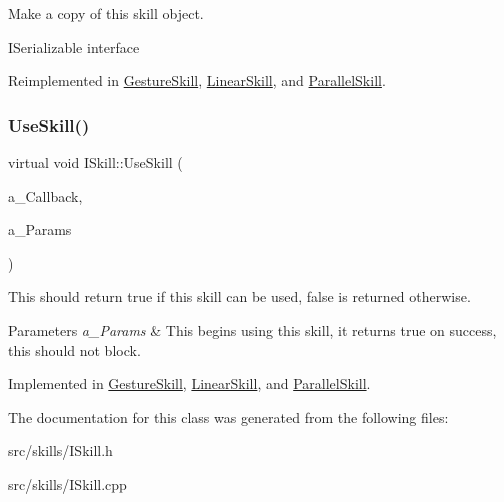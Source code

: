 Make a copy of this skill object. 

I\+Serializable interface 

Reimplemented in \hyperlink{class_gesture_skill_a9a0b5dcba0cbbced2bfc5108304d7513}{Gesture\+Skill}, \hyperlink{class_linear_skill_a848dd09f0e2c7db9a096e57a75266f40}{Linear\+Skill}, and \hyperlink{class_parallel_skill_a6b8c895c0996b4edec98cf4c26724fef}{Parallel\+Skill}.

\mbox{\label{class_i_skill_a0b9243b397c4902c973f191d32a6e46d}} 
\subsubsection{\texorpdfstring{Use\+Skill()}{UseSkill()}}
{\footnotesize\ttfamily virtual void I\+Skill\+::\+Use\+Skill (\begin{DoxyParamCaption}\item[{Skill\+Delegate}]{a\+\_\+\+Callback,  }\item[{const \hyperlink{class_params_map}{Params\+Map} \&}]{a\+\_\+\+Params }\end{DoxyParamCaption})\hspace{0.3cm}{\ttfamily [pure virtual]}}



This should return true if this skill can be used, false is returned otherwise. 


\begin{DoxyParams}{Parameters}
{\em a\+\_\+\+Params} & This begins using this skill, it returns true on success, this should not block. \\
\hline
\end{DoxyParams}


Implemented in \hyperlink{class_gesture_skill_a2cecea782e270b8e7fe86189f839c1e7}{Gesture\+Skill}, \hyperlink{class_linear_skill_a63f85339807231fb81997e88de3f612f}{Linear\+Skill}, and \hyperlink{class_parallel_skill_ad95fee894046921fb0d3e9c91034737e}{Parallel\+Skill}.



The documentation for this class was generated from the following files\+:\begin{DoxyCompactItemize}
\item 
src/skills/I\+Skill.\+h\item 
src/skills/I\+Skill.\+cpp\end{DoxyCompactItemize}
